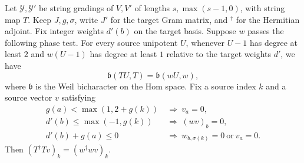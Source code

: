 \begin{lemma}
\label{lem:a-bessel-eichler-gram}
\emitthmsource
Let $\mathcal Y,\mathcal Y'$ be string gradings of $V,V'$ of lengths $s,\max(s-1,0)$, with string map $T$. Keep $J,g,\sigma$, write $J'$ for the target Gram matrix, and $^\dagger$ for the Hermitian adjoint. Fix integer weights $d'(b)$ on the target basis. Suppose $w$ passes the following phase test. For every source unipotent $U$, whenever $U-1$ has degree at least $2$ and $w(U-1)$ has degree at least $1$ relative to the target weights $d'$, we have
\[
 \mathfrak b(TU,T)=\mathfrak b(wU,w),
\]
where $\mathfrak b$ is the Weil bicharacter on the Hom space. Fix a source index $k$ and a source vector $v$ satisfying
\[
 \begin{aligned}
 g(a)<\max(1,2+g(k))&\ \Longrightarrow\ v_a=0,\\
 d'(b)\le\max(-1,g(k))&\ \Longrightarrow\ (wv)_b=0,\\
 d'(b)+g(a)\le0&\ \Longrightarrow\ 
                        w_{b,\sigma(k)}=0\ \text{or}\ v_a=0 .
 \end{aligned}
\]
Then $(T^\dagger T v)_k=(w^\dagger wv)_k$.
\end{lemma}
